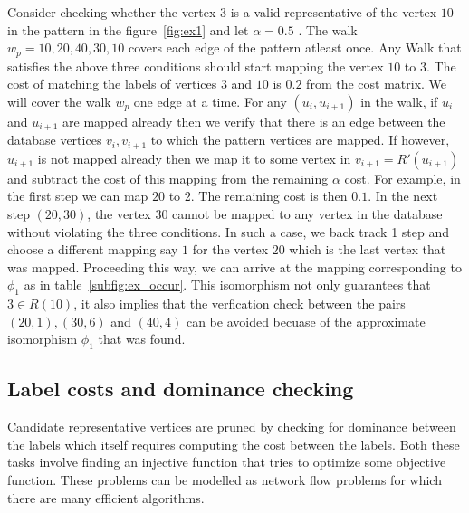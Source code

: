 Consider checking whether the vertex $3$ is a valid representative of the 
vertex $10$ in the pattern in the figure~\ref{fig:ex1} and let 
$\alpha = 0.5$ . The walk $ w_p = 10, 20, 40, 30, 10$
covers each edge of the pattern atleast once. Any Walk that satisfies the
above three conditions should start mapping the vertex $10$ to $3$. The cost of 
matching the labels of vertices $3$ and $10$ is $0.2$ from the cost matrix.
We will cover the walk $w_p$ one edge at a time. For any $(u_i, u_{i+1})$ in the walk, 
if $u_i$ and $u_{i+1}$ are mapped already then we verify that there is 
an edge between the database vertices $v_i, v_{i+1}$ to which the pattern vertices are mapped.
If however, $u_{i+1}$ is not mapped already then we map it to some vertex in $v_{i+1} = R'(u_{i+1})$
and subtract the cost of this mapping from the remaining $\alpha$ cost.
For example, in the first step we can map $20$ to $2$. The remaining
cost is then $0.1$. In the next step $(20,30)$, the vertex $30$
cannot be mapped to any vertex in the database without violating the three conditions.
In such a case, we back track 1 step and choose a different mapping say $1$
for the vertex $20$ which is the last vertex that was mapped. Proceeding this way, we can arrive
at the mapping corresponding to $\phi_{1}$ as in table~\ref{subfig:ex_occur}.
This isomorphism not only guarantees that $3 \in R(10)$, it also implies
that the verfication check between the pairs $(20, 1), (30, 6)$ and $(40, 4)$
can be avoided becuase of the approximate isomorphism $\phi_1$ that was found.



\subsection{Label costs and dominance checking}
Candidate representative vertices are pruned by checking for dominance between
the \ncl labels which itself requires computing the cost between the \khop labels.
Both these tasks involve finding an injective function that tries to optimize
some objective function. These problems can be modelled as network flow problems
for which there are many efficient algorithms. 

